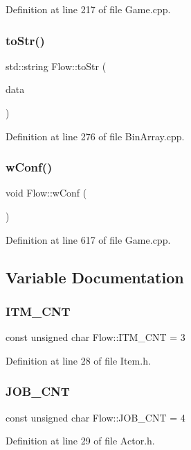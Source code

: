 Definition at line 217 of file Game.\+cpp.

\hypertarget{namespace_flow_aecdc302d3189de5ec98c40317efedc62}{}\label{namespace_flow_aecdc302d3189de5ec98c40317efedc62} 
\subsubsection{\texorpdfstring{to\+Str()}{toStr()}}
{\footnotesize\ttfamily std\+::string Flow\+::to\+Str (\begin{DoxyParamCaption}\item[{\hyperlink{class_flow_1_1_bin_array}{Bin\+Array} \&}]{data }\end{DoxyParamCaption})}



Definition at line 276 of file Bin\+Array.\+cpp.

\hypertarget{namespace_flow_a2d6d85749fd0dd65654b3682ad46b760}{}\label{namespace_flow_a2d6d85749fd0dd65654b3682ad46b760} 
\subsubsection{\texorpdfstring{w\+Conf()}{wConf()}}
{\footnotesize\ttfamily void Flow\+::w\+Conf (\begin{DoxyParamCaption}{ }\end{DoxyParamCaption})}



Definition at line 617 of file Game.\+cpp.



\subsection{Variable Documentation}
\hypertarget{namespace_flow_a185ca6f187c8d738b91552fe9a987dc6}{}\label{namespace_flow_a185ca6f187c8d738b91552fe9a987dc6} 
\subsubsection{\texorpdfstring{I\+T\+M\+\_\+\+C\+NT}{ITM\_CNT}}
{\footnotesize\ttfamily const unsigned char Flow\+::\+I\+T\+M\+\_\+\+C\+NT = 3}



Definition at line 28 of file Item.\+h.

\hypertarget{namespace_flow_abc8632eea1ea1050e9fc2f70cba06fb8}{}\label{namespace_flow_abc8632eea1ea1050e9fc2f70cba06fb8} 
\subsubsection{\texorpdfstring{J\+O\+B\+\_\+\+C\+NT}{JOB\_CNT}}
{\footnotesize\ttfamily const unsigned char Flow\+::\+J\+O\+B\+\_\+\+C\+NT = 4}



Definition at line 29 of file Actor.\+h.

